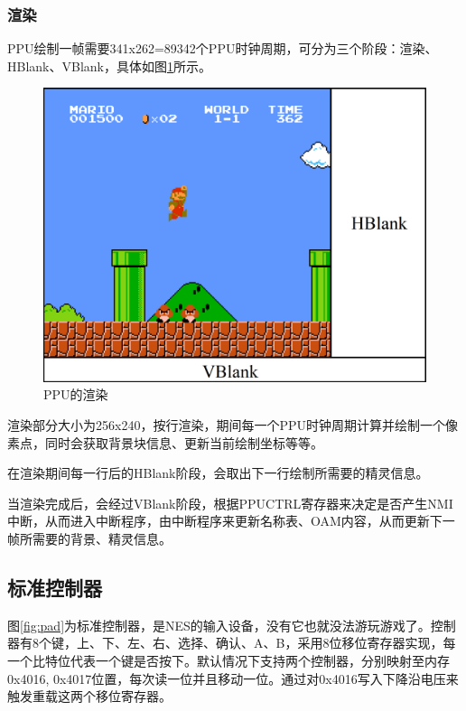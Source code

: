 \documentclass[a4paper]{ltxdoc}
\begin{document}
{\subsubsection{渲染}
PPU绘制一帧需要341x262=89342个PPU时钟周期，可分为三个阶段：渲染、HBlank、VBlank，具体如图\ref{fig:rendering}所示。
\begin{figure}[h]
	\centering
	\includegraphics[width=\textwidth]{images/vblank_hblank.png}
	\caption{PPU的渲染}
	\label{fig:rendering}
\end{figure}

渲染部分大小为256x240，按行渲染，期间每一个PPU时钟周期计算并绘制一个像素点，同时会获取背景块信息、更新当前绘制坐标等等\cite{ppurendering}。

在渲染期间每一行后的HBlank阶段，会取出下一行绘制所需要的精灵信息。\cite{evalsprite}

当渲染完成后，会经过VBlank阶段，根据PPUCTRL寄存器来决定是否产生NMI中断，从而进入中断程序，由中断程序来更新名称表、OAM内容，从而更新下一帧所需要的背景、精灵信息。

\subsection{标准控制器}
图\ref{fig:pad}为标准控制器，是NES的输入设备，没有它也就没法游玩游戏了。控制器有8个键，上、下、左、右、选择、确认、A、B，采用8位移位寄存器实现，每一个比特位代表一个键是否按下。默认情况下支持两个控制器，分别映射至内存0x4016, 0x4017位置，每次读一位并且移动一位。通过对0x4016写入下降沿电压来触发重载这两个移位寄存器。

}
\end{document}
